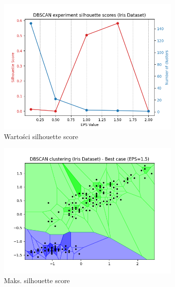 \documentclass[12pt]{article}
\begin{document}
\begin{figure}[H]
    \centering
    \begin{subfigure}[t]{0.24\textwidth}
        \includegraphics[width=\linewidth]{img/other_datasets/iris_dbscan_silhouette.png}
        \caption{Wartości silhouette score}
    \end{subfigure}
    \hfill
    \begin{subfigure}[t]{0.24\textwidth}
        \includegraphics[width=\linewidth]{img/other_datasets/iris_dbscan_blind_best.png}
        \caption{Maks. silhouette score}
    \end{subfigure}
    \hfill
    \begin{subfigure}[t]{0.24\textwidth}

\end{subfigure}
\end{figure}
\end{document}
